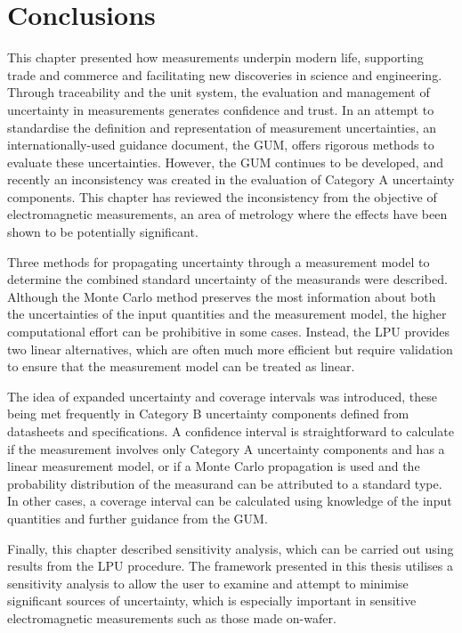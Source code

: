 \documentclass[../thesis/thesis.tex]{subfiles}
\begin{document}
\section{Conclusions}

This chapter presented how measurements underpin modern life, supporting trade and commerce and facilitating new discoveries in science and engineering. Through traceability and the unit system, the evaluation and management of uncertainty in measurements generates confidence and trust. In an attempt to standardise the definition and representation of measurement uncertainties, an internationally-used guidance document, the GUM, offers rigorous methods to evaluate these uncertainties. However, the GUM continues to be developed, and recently an inconsistency was created in the evaluation of Category A uncertainty components. This chapter has reviewed the inconsistency from the objective of electromagnetic measurements, an area of metrology where the effects have been shown to be potentially significant.

Three methods for propagating uncertainty through a measurement model to determine the combined standard uncertainty of the measurands were described. Although the Monte Carlo method preserves the most information about both the uncertainties of the input quantities and the measurement model, the higher computational effort can be prohibitive in some cases. Instead, the LPU provides two linear alternatives, which are often much more efficient but require validation to ensure that the measurement model can be treated as linear.

The idea of expanded uncertainty and coverage intervals was introduced, these being met frequently in Category B uncertainty components defined from datasheets and specifications. A confidence interval is straightforward to calculate if the measurement involves only Category A uncertainty components and has a linear measurement model, or if a Monte Carlo propagation is used and the probability distribution of the measurand can be attributed to a standard type. In other cases, a coverage interval can be calculated using knowledge of the input quantities and further guidance from the GUM.

Finally, this chapter described sensitivity analysis, which can be carried out using results from the LPU procedure. The framework presented in this thesis utilises a sensitivity analysis to allow the user to examine and attempt to minimise significant sources of uncertainty, which is especially important in sensitive electromagnetic measurements such as those made on-wafer.

\end{document}
